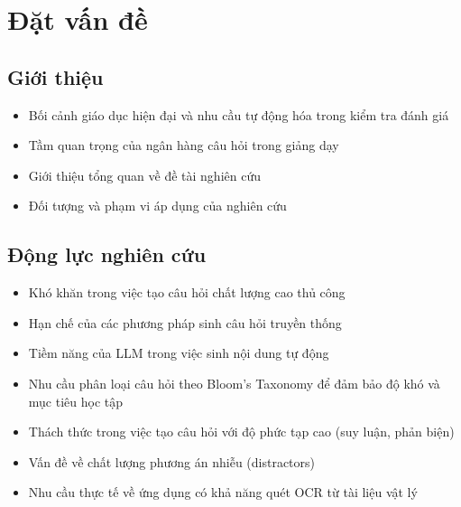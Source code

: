 
\chapter{Đặt vấn đề}

\section{Giới thiệu}
\begin{itemize}
    \item Bối cảnh giáo dục hiện đại và nhu cầu tự động hóa trong kiểm tra đánh giá
    \item Tầm quan trọng của ngân hàng câu hỏi trong giảng dạy
    \item Giới thiệu tổng quan về đề tài nghiên cứu
    \item Đối tượng và phạm vi áp dụng của nghiên cứu
\end{itemize}

\section{Động lực nghiên cứu}
\begin{itemize}
    \item Khó khăn trong việc tạo câu hỏi chất lượng cao thủ công
    \item Hạn chế của các phương pháp sinh câu hỏi truyền thống
    \item Tiềm năng của LLM trong việc sinh nội dung tự động
    \item Nhu cầu phân loại câu hỏi theo Bloom's Taxonomy để đảm bảo độ khó và mục tiêu học tập
    \item Thách thức trong việc tạo câu hỏi với độ phức tạp cao (suy luận, phản biện)
    \item Vấn đề về chất lượng phương án nhiễu (distractors)
    \item Nhu cầu thực tế về ứng dụng có khả năng quét OCR từ tài liệu vật lý
\end{itemize}

